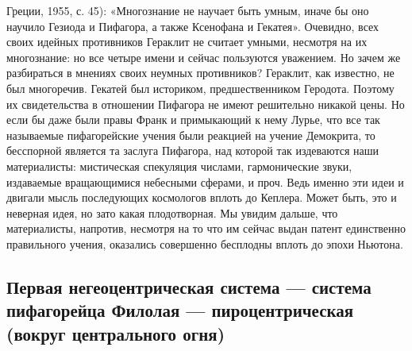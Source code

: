 Греции, 1955, с. 45): «Многознание не научает быть умным, иначе бы оно
научило Гезиода и Пифагора, а также Ксенофана и Гекатея». Очевидно,
всех своих идейных противников Гераклит не считает умными, несмотря на
их многознание: но все четыре имени и сейчас пользуются уважением. Но
зачем же разбираться в мнениях своих неумных противников? Гераклит,
как известно, не был многоречив. Гекатей был историком,
предшественником Геродота. Поэтому их свидетельства в отношении
Пифагора не имеют решительно никакой цены. Но если бы даже были правы
Франк и примыкающий к нему Лурье, что все так называемые пифагорейские
учения были реакцией на учение Демокрита, то бесспорной является та
заслуга Пифагора, над которой так издеваются наши материалисты:
мистическая спекуляция числами, гармонические звуки, издаваемые
вращающимися небесными сферами, и проч. Ведь именно эти идеи и двигали
мысль последующих космологов вплоть до Кеплера. Может быть, это и
неверная идея, но зато какая плодотворная. Мы увидим дальше, что
материалисты, напротив, несмотря на то что им сейчас выдан патент
единственно правильного учения, оказались совершенно бесплодны вплоть
до эпохи Ньютона.

\subsection{Первая негеоцентрическая система --- система пифагорейца
Филолая --- пироцентрическая (вокруг центрального огня)}

